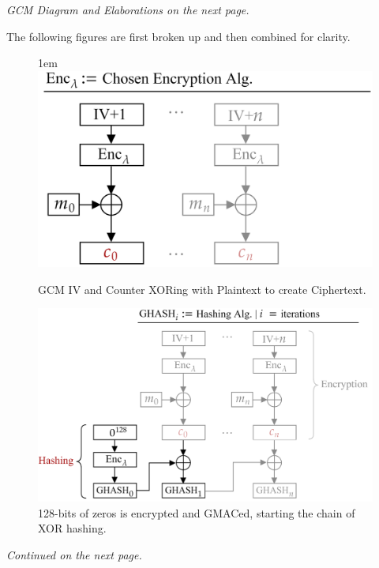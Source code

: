 \vfill
\begin{center}
    \textit{GCM Diagram and Elaborations on the next page.}
\end{center}
\vfill 

\newpage

\noindent
The following figures are first broken up and then combined for clarity.\\

\begin{figure}[h!]
    \centering
    \hfill{1em}
    \includegraphics[width=.8\textwidth]{Sections/sec/enc/iv.png}
    \caption{GCM IV and Counter XORing with Plaintext to create Ciphertext.}
    \label{fig:block_cipher}
\end{figure}

\begin{figure}[h!]
    \centering
    \includegraphics[width=.9\textwidth]{Sections/sec/enc/ghash.png}
    \caption{128-bits of zeros is encrypted and GMACed, starting the chain of XOR hashing.}
    \label{fig:block_cipher}
\end{figure}
\vfill
\begin{center}
    \textit{Continued on the next page.}
\end{center}
\vfill 
\newpage 

